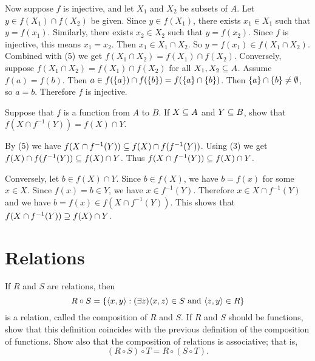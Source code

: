 \documentclass{report}
\renewcommand*{\land}{\text{ and }}
\begin{document}
\begin{solution}
Now suppose $f$ is injective, and let $X_1$ and $X_2$ be subsets of $A$.
Let $y\in f(X_1)\cap f(X_2)$ be given.
Since $y\in f(X_1)$, there exists $x_1\in X_1$ such that $y=f(x_1)$.
Similarly, there exists $x_2\in X_2$ such that $y=f(x_2)$.
Since $f$ is injective, this means $x_1=x_2$. Then $x_1\in X_1\cap X_2$.
So $y=f(x_1)\in f(X_1\cap X_2)$. Combined with (5) we get $f(X_1\cap X_2)= f(X_1)\cap f(X_2)$.
Conversely, suppose $f(X_1\cap X_2)= f(X_1)\cap f(X_2)$ for all $X_1,X_2\subseteq A$.
Assume $f(a)=f(b)$. Then $a\in f(\left\{a\right\})\cap f(\left\{b\right\})=f(\left\{a\right\}\cap\left\{b\right\})$.
Then $\left\{a\right\}\cap\left\{b\right\}\neq\emptyset$, so $a=b$. Therefore $f$ is injective.
\end{solution}

\begin{exercise}
Suppose that $f$ is a function from $A$ to $B$. If $X\subseteq A$ and $Y\subseteq B$, show that
$f(X\cap f^{-1}(Y)) = f(X)\cap Y$.
\end{exercise}

\begin{solution}
By (5) we have $f(X\cap f^{-1}(Y)) \subseteq f(X)\cap f(f^{-1}(Y))$.
Using (3) we get $f(X)\cap f(f^{-1}(Y))\subseteq f(X)\cap Y$.
Thus $f(X\cap f^{-1}(Y)) \subseteq f(X)\cap Y$.

Conversely, let $b\in f(X)\cap Y$. Since $b\in f(X)$, we have $b=f(x)$ for some $x\in X$.
Since $f(x)=b\in Y$, we have $x\in f^{-1}(Y)$. Therefore $x\in X\cap f^{-1}(Y)$ and we have
$b=f(x)\in f(X\cap f^{-1}(Y))$.
This shows that $f(X\cap f^{-1}(Y)) \supseteq f(X)\cap Y$.
\end{solution}

\section{Relations}
\begin{exercise}
If $R$ and $S$ are relations, then
\[R\circ S = \setb{\aprn{x,y}}{(\exists z)\aprn{x,z}\in S\land\aprn{z,y}\in R}\]
is a relation, called the composition of $R$ and $S$. If $R$ and $S$ should be functions, show
that this definition coincides with the previous definition of the composition of functions.
Show also that the composition of relations is associative; that is,
\[(R\circ S)\circ T=R\circ (S\circ T).\]
\end{exercise}
\end{document}
